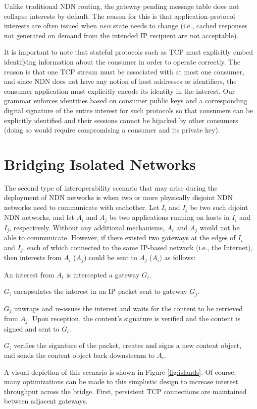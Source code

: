 Unlike traditional NDN routing, the gateway pending message table does not collapse interests by default. The reason for this is that application-protocol interests are often issued when \emph{new} state needs to change (i.e., cached responses not generated on demand from the intended IP recipient are not acceptable). 

It is important to note that stateful protocols such as TCP must explicitly embed identifying information about the consumer in order to operate correctly. The reason is that one TCP stream must be associated with at most one consumer, and since NDN does not have any notion of host addresses or identifiers, the consumer application must explicitly encode its identity in the interest. Our grammar enforces identities based on consumer public keys and a corresponding digital signature of the entire interest for such protocols so that consumers can be explicitly identified and their sessions cannot be hijacked by other consumers (doing so would require compromising a consumer and its private key).

\section{Bridging Isolated Networks}
The second type of interoperability scenario that may arise during the deployment of NDN networks is when two or more physically disjoint NDN networks need to communicate with eachother. Let $I_i$ and $I_j$ be two such dijoint NDN networks, and let $A_i$ and $A_j$ be two applications running on hosts in $I_i$ and $I_j$, respectively. Without any additional mechanisms, $A_i$ and $A_j$ would not be able to communicate. However, if there existed two gateways at the edges of $I_i$ and $I_j$, each of which connected to the same IP-based network (i.e., the Internet), then interests from $A_i$ ($A_j$) could be sent to $A_j$ ($A_i)$ as follows:
\begin{compactenum} 
	\item An interest from $A_i$ is intercepted a gateway $G_i$.
	\item $G_i$ encapsulates the interest in an IP packet sent to gateway $G_j$.
	\item $G_j$ unwraps and re-issues the interest and waits for the content to be retrieved from $A_j$. Upon reception, the content's signature is verified and the content is signed and sent to $G_i$. 
	\item $G_i$ verifies the signature of the packet, creates and signs a new content object, and sends the content object back downstream to $A_i$.
\end{compactenum}
A visual depiction of this scenario is shown in Figure \ref{fig:islands}. Of course, many optimizations can be made to this simplistic design to increase interest throughput across the bridge. First, persistent TCP connections are maintained between adjacent gateways.

